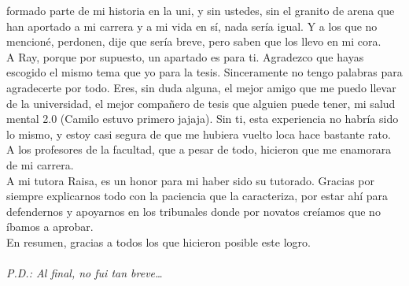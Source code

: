 formado parte de mi historia en la uni, y sin ustedes, sin el granito de arena que han aportado a mi carrera y a mi vida en sí, nada sería igual. Y a los que no mencioné, perdonen, dije que sería breve, pero saben que los llevo en mi cora. \\
A Ray, porque por supuesto, un apartado es para ti. Agradezco que hayas escogido el mismo tema que yo para la tesis. Sinceramente no tengo palabras para agradecerte por todo. Eres, sin duda alguna, el mejor amigo que me puedo llevar de la universidad, el mejor compañero de tesis que alguien puede tener, mi salud mental 2.0 (Camilo estuvo primero jajaja). Sin ti, esta experiencia no habría sido lo mismo, y estoy casi segura de que me hubiera vuelto loca hace bastante rato. \\
A los profesores de la facultad, que a pesar de todo, hicieron que me enamorara de mi carrera. \\
A mi tutora Raisa, es un honor para mi haber sido su tutorado. Gracias por siempre explicarnos todo con la paciencia que la caracteriza, por estar ahí para defendernos y apoyarnos en los tribunales donde por novatos creíamos que no íbamos a aprobar. \\
En resumen, gracias a todos los que hicieron posible este logro. \\ \\

\textit{P.D.: Al final, no fui tan breve…}